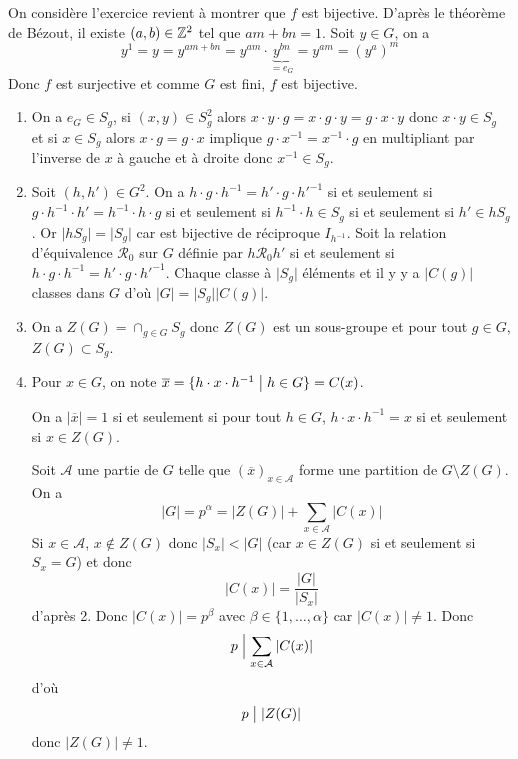 \begin{solution}
	On considère 
	l'exercice revient à montrer que $f$ est bijective. D'après le théorème de Bézout, il existe $(a,b)\in\mathbb{Z}^{2}$ tel que $am+bn=1$. Soit $y\in G$, on a 
	$$y^{1}=y=y^{am+bn}=y^{am}\cdot \underbrace{y^{bn}}_{=e_{G}}=y^{am}=(y^{a})^{m}$$
	Donc $f$ est surjective et comme $G$ est fini, $f$ est bijective.
\end{solution}

\begin{solution}
	\phantom{}
	\begin{enumerate}
		\item On a $e_{G}\in S_{g}$, si $(x,y)\in S_{g}^{2}$ alors $x\cdot y\cdot g=x\cdot g\cdot y=g\cdot x\cdot y$ donc $x\cdot y\in S_{g}$ et si $x\in S_{g}$ alors $x\cdot g=g\cdot x$ implique $g\cdot x^{-1}=x^{-1}\cdot g$ en multipliant par l'inverse de $x$ à gauche et à droite donc $x^{-1}\in S_{g}$.
		
		\item Soit $(h,h')\in G^{2}$. On a $h\cdot g\cdot h^{-1}=h'\cdot g\cdot h'^{-1}$ si et seulement si $g\cdot h^{-1}\cdot h'=h^{-1}\cdot h\cdot g$ si et seulement si $h^{-1}\cdot h\in S_{g}$ si et seulement si $h'\in hS_{g}$. Or $\vert hS_{g}\vert=\vert S_{g}\vert$ car  est bijective de réciproque $I_{h^{-1}}$. Soit la relation d'équivalence $\mathcal{R}_{0}$ sur $G$ définie par $h\mathcal{R}_{0}h'$ si et seulement si $h\cdot g\cdot h^{-1}=h'\cdot g\cdot h'^{-1}$. Chaque classe à $\vert S_{g}\vert$ éléments et il y y a $\vert C(g)\vert$ classes dans $G$ d'où $\vert G\vert=\vert S_{g}\vert\vert C(g)\vert$.
		
		\item On a $Z(G)=\cap_{g\in G}S_{g}$ donc $Z(G)$ est un sous-groupe et pour tout $g\in G$, $Z(G)\subset S_{g}$.
		
		\item Pour $x\in G$, on note $\overline{x}=\{h\cdot x\cdot h^{-1}\bigm| h\in G\}=C(x)$. 
		
		On a $\vert\overline{x}\vert=1$ si et seulement si pour tout $h\in G$, $h\cdot x\cdot h^{-1}=x$ si et seulement si $x\in Z(G)$.
		
		Soit $\mathcal{A}$ une partie de $G$ telle que $(\overline{x})_{x\in\mathcal{A}}$ forme une partition de $G\setminus Z(G)$. On a 
		$$\vert G\vert=p^{\alpha}=\vert Z(G)\vert+\sum_{x\in\mathcal{A}}\vert C(x)\vert$$
		Si $x\in\mathcal{A}$, $x\notin Z(G)$ donc $\vert S_{x}\vert <\vert G\vert$ (car $x\in Z(G)$ si et seulement si $S_{x}=G$) et donc 
		$$\vert C(x)\vert=\frac{\vert G\vert}{\vert S_{x}\vert}$$
		d'après 2. Donc $\vert C(x)\vert=p^{\beta}$ avec $\beta\in\{1,\dots,\alpha\}$ car $\vert C(x)\vert\neq 1$. Donc 
		$$p\Bigm|\sum_{x\in\mathcal{A}}\vert C(x)\vert$$
		d'où 
		$$p\bigm|\vert Z(G)\vert$$
		donc $\vert Z(G)\vert\neq1$.


\end{enumerate}
\end{solution}
